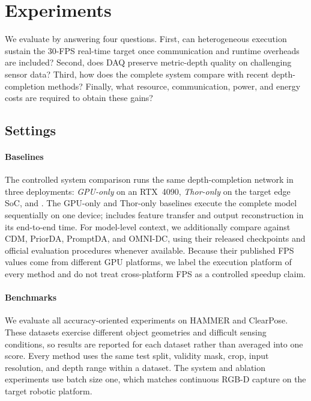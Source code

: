 \section{Experiments}
\label{sec:experiments}

We evaluate \system{} by answering four questions.  First, can heterogeneous
execution sustain the 30-FPS real-time target once communication and runtime
overheads are included?  Second, does DAQ preserve metric-depth quality on
challenging sensor data?  Third, how does the complete system compare with
recent depth-completion methods?  Finally, what resource, communication,
power, and energy costs are required to obtain these gains?

\subsection{Settings}
\label{sec:settings}

\paragraph{Baselines}
The controlled system comparison runs the same depth-completion network in
three deployments: \emph{GPU-only} on an RTX~4090, \emph{Thor-only} on the
target edge SoC, and \system{}.  The GPU-only and Thor-only baselines execute
the complete model sequentially on one device; \system{} includes feature
transfer and output reconstruction in its end-to-end time.  For model-level
context, we additionally compare against CDM, PriorDA, PromptDA, and OMNI-DC,
using their released checkpoints and official evaluation procedures whenever
available.  Because their published FPS values come from different GPU
platforms, we label the execution platform of every method and do not treat
cross-platform FPS as a controlled speedup claim.

\paragraph{Benchmarks}
We evaluate all accuracy-oriented experiments on HAMMER and ClearPose.  These
datasets exercise different object geometries and difficult sensing conditions,
so results are reported for each dataset rather than averaged into one score.
Every method uses the same test split, validity mask, crop, input resolution,
and depth range within a dataset.  The system and ablation experiments use
batch size one, which matches continuous RGB-D capture on the target robotic
platform.


